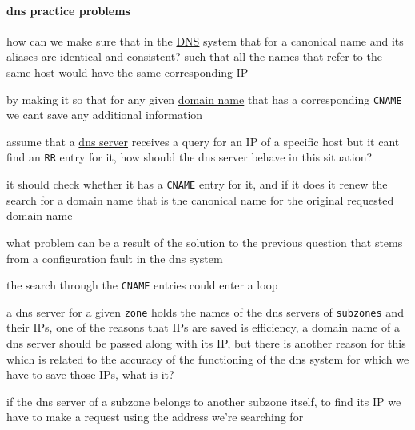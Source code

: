 \documentclass[a4paper,12pt]{article}
\begin{document}
\paragraph{dns practice problems}
\label{sec:org71c94f0}
\begin{question}
how can we make sure that in the \hyperref[sec:org15194d9]{DNS} system that for a canonical name and its aliases are identical and consistent? such that all the names that refer to the same host would have the same corresponding \hyperref[sec:org07a120e]{IP}\\
\begin{answer}
by making it so that for any given \hyperref[sec:orga14cc92]{domain name} that has a corresponding \texttt{CNAME} we cant save any additional information\\
\end{answer}
\end{question}
\begin{question}
assume that a \hyperref[sec:orgc121ad0]{dns server} receives a query for an IP of a specific host but it cant find an \texttt{RR} entry for it, how should the dns server behave in this situation?\\
\begin{answer}
it should check whether it has a \texttt{CNAME} entry for it, and if it does it renew the search for a domain name that is the canonical name for the original requested domain name\\
\end{answer}
\end{question}
\begin{question}
what problem can be a result of the solution to the previous question that stems from a configuration fault in the dns system\\
\begin{answer}
the search through the \texttt{CNAME} entries could enter a loop\\
\end{answer}
\end{question}
\begin{question}
a dns server for a given \texttt{zone} holds the names of the dns servers of \texttt{subzones} and their IPs, one of the reasons that IPs are saved is efficiency, a domain name of a dns server should be passed along with its IP, but there is another reason for this which is related to the accuracy of the functioning of the dns system for which we have to save those IPs, what is it?\\
\begin{answer}
if the dns server of a subzone belongs to another subzone itself, to find its IP we have to make a request using the address we're searching for\\
\end{answer}
\end{question}
\end{document}
